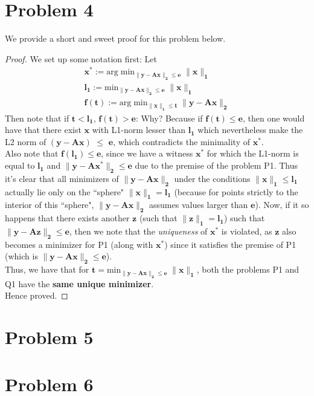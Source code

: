 \documentclass[a4paper,11pt]{article}
\numberwithin{definition}{section}
\numberwithin{mytheorem}{subsection}
\begin{document}
\section{Problem 4}
We provide a short and sweet proof for this problem below.
\begin{proof}
We set up some notation first: Let 
\begin{gather*}
    \boldsymbol{x^*} :=  \mathrm{arg\;min}\boldsymbol{_{\lVert y - Ax\rVert_2 \leq e}\;\lVert x\rVert_1} \\
    \boldsymbol{l_1 := } \mathrm{min}\boldsymbol{_{\lVert y - Ax\rVert_2 \leq e}\;\lVert x\rVert_1} \\
    \boldsymbol{f(t) := } \mathrm{arg\;min}\boldsymbol{_{\lVert x\rVert_1 \leq t}\; \lVert y - Ax\rVert_2} 
\end{gather*}
Then note that if $\boldsymbol{t < l_1}$, $\boldsymbol{f(t) > e}$: Why? Because if $\boldsymbol{f(t) \leq e}$, then one would have that there exist $\boldsymbol{x}$ with L1-norm lesser than $\boldsymbol{l_1}$ which nevertheless make the L2 norm of $\boldsymbol{(y - Ax)}$ $\leq$ $\boldsymbol{e}$, which contradicts the minimality of $\boldsymbol{x^*}$.\\
Also note that $\boldsymbol{f(l_1) \leq e}$, since we have a witness $\boldsymbol{x^*}$ for which the L1-norm is equal to $\boldsymbol{l_1}$ and $\boldsymbol{\lVert y - Ax^*\rVert_2 \leq e}$ due to the premise of the problem P1. Thus it's clear that all minimizers of $\boldsymbol{\lVert y - Ax\rVert_2}$ under the conditions $\boldsymbol{\lVert x\rVert_1 \leq l_1}$ actually lie only on the ``sphere" $\boldsymbol{\lVert x\rVert_1 = l_1}$ (because for points strictly to the interior of this ``sphere", $\boldsymbol{\lVert y - Ax\rVert_2}$ assumes values larger than $\boldsymbol{e}$). Now, if it so happens that there exists another $\boldsymbol{z}$ (such that $\boldsymbol{\lVert z\rVert_1 = l_1}$) such that $\boldsymbol{\lVert y - Az\rVert_2 \leq e}$, then we note that the \emph{uniqueness} of $\boldsymbol{x^*}$ is violated, as $\boldsymbol{z}$ also becomes a minimizer for P1 (along with $\boldsymbol{x^*}$) since it satisfies the premise of P1 (which is $\boldsymbol{\lVert y - Ax\rVert_2 \leq e}$).\\
Thus, we have that for $\boldsymbol{t = \mathrm{min}_{\lVert y - Ax\rVert_2 \leq e}\;\lVert x\rVert_1}$, both the problems P1 and Q1 have the \textbf{same unique minimizer}.\\
Hence proved.
\end{proof}


\newpage
\section{Problem 5}






\newpage

\section{Problem 6}
\end{document}
